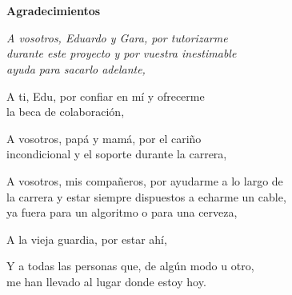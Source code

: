 
\chapter*{}
\begin{flushright}
    {\Huge\textbf{Agradecimientos}}
    \bigskip
    \bigskip

    {\itshape
        A vosotros, Eduardo y Gara, por tutorizarme\\
        durante este proyecto y por vuestra inestimable \\
        ayuda para sacarlo adelante,
        \bigskip
        
        A ti, Edu, por confiar en mí y ofrecerme \\
        la beca de colaboración,
        \bigskip
        
        A vosotros, papá y mamá, por el cariño \\ 
        incondicional y el soporte durante la carrera,
        \bigskip
        
        A vosotros, mis compañeros, por ayudarme a lo largo de \\
        la carrera y estar siempre dispuestos a echarme un cable, \\
        ya fuera para un algoritmo o para una cerveza,
        \bigskip

        A la vieja guardia, por estar ahí,
        \bigskip
        
        Y a todas las personas que, de algún modo u otro, \\
        me han llevado al lugar donde estoy hoy.
        \bigskip
        
        }
\end{flushright}
